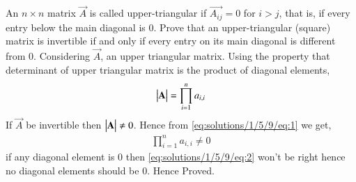 An $n\times n$ matrix $\vec{A}$ is called upper-triangular if $\vec{A_{ij}}=0$ for $i>j$, that is, if every entry below the main diagonal is 0. Prove that an upper-triangular (square) matrix is invertible if and only if every entry on its main diagonal is different from 0.
Considering $\vec{A}$, an upper triangular matrix. Using the property that determinant of upper triangular matrix is the product of diagonal elements,
\begin{align}
\begin{vmatrix}\mathbf{A}\end{vmatrix}= \prod_{i=1}^{n} a_{i,i}\label{eq:solutions/1/5/9/eq:1}
\end{align}
If $\vec{A}$ be invertible then  $\begin{vmatrix}\mathbf{A}\end{vmatrix} \neq 0$. Hence from \eqref{eq:solutions/1/5/9/eq:1} we get,
\begin{align}
\prod_{i=1}^{n} a_{i,i} \neq 0 \label{eq:solutions/1/5/9/eq:2}
\end{align}
if any diagonal element is 0 then \eqref{eq:solutions/1/5/9/eq:2} won't be right hence no diagonal elements should be 0.
Hence Proved.
